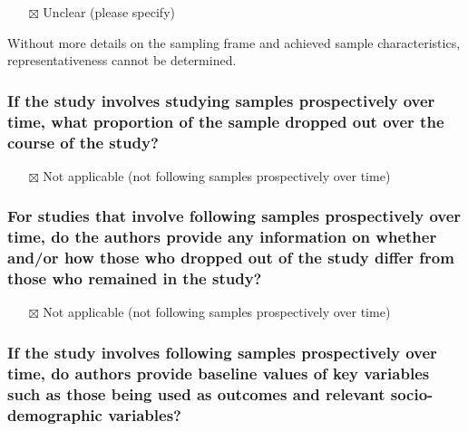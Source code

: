 \documentclass[
  doc, a4paper]{apa7}
\providecommand{\tightlist}{%
  \setlength{\itemsep}{0pt}\setlength{\parskip}{0pt}}
\begin{document}
\begin{itemize}
\tightlist
\item[$\boxtimes$]
  Unclear (please specify)
\end{itemize}

Without more details on the sampling frame and achieved sample characteristics, representativeness cannot be determined.

\subsubsection{If the study involves studying samples prospectively over time, what proportion of the sample dropped out over the course of the study?}\label{if-the-study-involves-studying-samples-prospectively-over-time-what-proportion-of-the-sample-dropped-out-over-the-course-of-the-study}

\begin{itemize}
\tightlist
\item[$\boxtimes$]
  Not applicable (not following samples prospectively over time)
\end{itemize}

\subsubsection{For studies that involve following samples prospectively over time, do the authors provide any information on whether and/or how those who dropped out of the study differ from those who remained in the study?}\label{for-studies-that-involve-following-samples-prospectively-over-time-do-the-authors-provide-any-information-on-whether-andor-how-those-who-dropped-out-of-the-study-differ-from-those-who-remained-in-the-study}

\begin{itemize}
\tightlist
\item[$\boxtimes$]
  Not applicable (not following samples prospectively over time)
\end{itemize}

\subsubsection{If the study involves following samples prospectively over time, do authors provide baseline values of key variables such as those being used as outcomes and relevant socio-demographic variables?}\label{if-the-study-involves-following-samples-prospectively-over-time-do-authors-provide-baseline-values-of-key-variables-such-as-those-being-used-as-outcomes-and-relevant-socio-demographic-variables}
\end{document}
